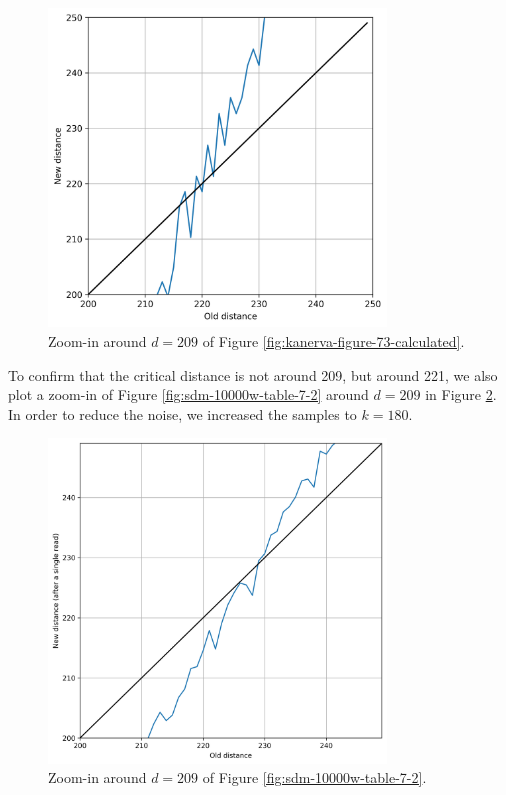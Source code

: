 \begin{figure}[!htb]
\centering\includegraphics[width=0.8\textwidth]{./images02/figure-73-eq-zoom.png}
\caption{Zoom-in around $d=209$ of Figure \ref{fig:kanerva-figure-73-calculated}.
\label{fig:figure-73-eq-zoom-in}
}
\end{figure}

To confirm that the critical distance is not around 209, but around 221, we also plot a zoom-in of Figure \ref{fig:sdm-10000w-table-7-2} around $d=209$ in Figure \ref{fig:sdm-10000w-zoom}. In order to reduce the noise, we increased the samples to $k=180$.

\begin{figure}[!htb]
\centering\includegraphics[width=0.8\textwidth]{./images02/sdm-10000w-zoom-209.png}
\caption{Zoom-in around $d=209$ of Figure \ref{fig:sdm-10000w-table-7-2}.
\label{fig:sdm-10000w-zoom}
}
\end{figure}


